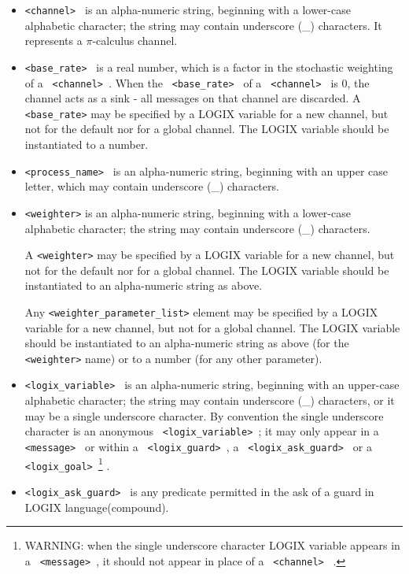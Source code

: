 \begin{itemize}
\item
\verb+<channel> + is an alpha-numeric string, beginning with a lower-case
alphabetic character; the string may contain underscore (\_) characters.
It represents a $\pi$-calculus channel.

\item
\verb+<base_rate> + is a real number, which is a factor in the
stochastic  weighting of a \verb+ <channel> +.  When the
\verb+ <base_rate> + of a \verb+ <channel> + \linebreak is 0, the
channel acts as a sink - all messages on that channel are discarded.
\noindent
A \verb+<base_rate>+ may be specified by a LOGIX variable for a new channel,
but not for the default nor for a global channel.  The LOGIX variable
should be instantiated to a number.
\item
\verb+<process_name> + is an alpha-numeric string, beginning with an
upper case letter, which may contain underscore (\_) characters.

\item
\verb+<weighter>+ is an alpha-numeric string, beginning with a lower-case
alphabetic character; the string may contain underscore (\_)
characters.

A \verb+<weighter>+ may be specified by a LOGIX variable for a new channel,
but not for the default nor for a global channel.  The LOGIX variable
should be instantiated to an alpha-numeric string as above.

Any \verb+<weighter_parameter_list>+ element may be specified by a
LOGIX variable for a new channel, but not for a global channel.
The LOGIX variable should be instantiated to an alpha-numeric string as
above (for the \verb+<weighter>+ name) or to a number (for any other parameter).

\item
\verb+<logix_variable> + is an alpha-numeric string, beginning with an
upper-case alphabetic character; the string may contain underscore
(\_) characters, or it may be a single underscore character.  By
convention the single underscore character is an anonymous
\verb+ <logix_variable> +; it may only appear in a \verb+ <message> + or
within a \verb+ <logix_guard> +, a \verb+ <logix_ask_guard> + or a
\verb+ <logix_goal> +\footnote{WARNING: when the single underscore
character LOGIX variable appears in a \verb+ <message> +, it
should not appear in place of a \verb+ <channel> + . } .

\item
\verb+<logix_ask_guard> + is any predicate permitted in the ask of a
guard in LOGIX language(compound).


\end{itemize}
